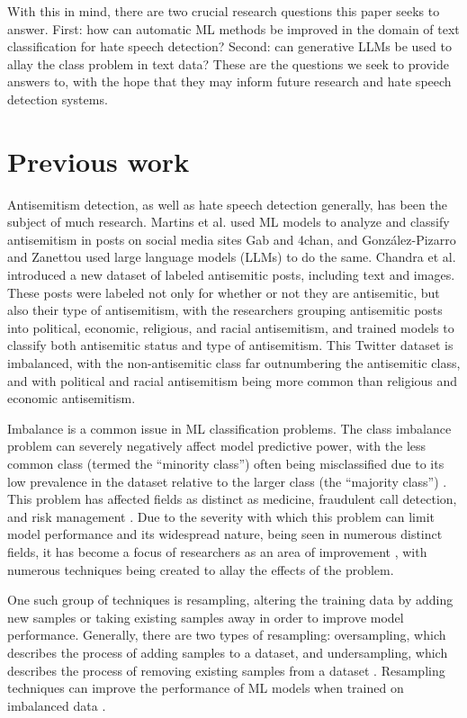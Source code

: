 \documentclass[runningheads]{llncs}
\begin{document}
With this in mind, there are two crucial research questions this paper seeks to answer. First: how can automatic ML methods be improved in the domain of text classification for hate speech detection? Second: can generative LLMs be used to allay the class problem in text data? These are the questions we seek to provide answers to, with the hope that they may inform future research and hate speech detection systems.

\section{Previous work}
Antisemitism detection, as well as hate speech detection generally, has been the subject of much research. Martins et al. \cite{martins} used ML models to analyze and classify antisemitism in posts on social media sites Gab and 4chan, and González-Pizarro and Zanettou \cite{gonzalez} used large language models (LLMs) to do the same. Chandra et al. \cite{chandra} introduced a new dataset of labeled antisemitic posts, including text and images. These posts were labeled not only for whether or not they are antisemitic, but also their type of antisemitism, with the researchers grouping antisemitic posts into political, economic, religious, and racial antisemitism, and trained models to classify both antisemitic status and type of antisemitism. This Twitter dataset is imbalanced, with the non-antisemitic class far outnumbering the antisemitic class, and with political and racial antisemitism being more common than religious and economic antisemitism.

Imbalance is a common issue in ML classification problems. The class imbalance problem can severely negatively affect model predictive power, with the less common class (termed the ``minority class'') often being misclassified due to its low prevalence in the dataset relative to the larger class (the ``majority class'') \cite{abdelrahman}. This problem has affected fields as distinct as medicine, fraudulent call detection, and risk management \cite{sun}. Due to the severity with which this problem can limit model performance and its widespread nature, being seen in numerous distinct fields, it has become a focus of researchers as an area of improvement \cite{abdelrahman}, with numerous techniques being created to allay the effects of the problem.

One such group of techniques is resampling, altering the training data by adding new samples or taking existing samples away in order to improve model performance. Generally, there are two types of resampling: oversampling, which describes the process of adding samples to a dataset, and undersampling, which describes the process of removing existing samples from a dataset \cite{shelke}. Resampling techniques can improve the performance of ML models when trained on imbalanced data \cite{lee} \cite{khushi}.
\end{document}
